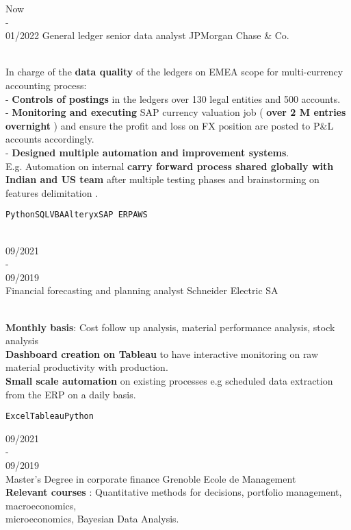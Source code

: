 \documentclass[10pt]{formatting/format} %
\begin{document}
\begin{entrylist}
	\entry
		{\color{text} Now\\ -\\ 01/2022}
		{\color{text} \large General ledger senior data analyst}
		{\color{text} \large JPMorgan Chase \& Co.}
		{\color{text} \\In charge of the \textbf{data quality} of the ledgers on EMEA scope for multi-currency accounting process: \\- \textbf{Controls of postings} in the ledgers over 130 legal entities and 500 accounts.\\ - \textbf{Monitoring and executing} SAP currency valuation  job ( \textbf{over 2 M entries overnight} ) and ensure the profit and loss on FX position are posted to P\&L accounts accordingly.\\ 
  - \textbf{Designed multiple automation and improvement systems}.\\ E.g. Automation on internal \textbf{carry forward process shared globally with Indian and US team} after multiple testing phases and brainstorming on features delimitation .
 
\small{\texttt{Python}\slashsep\texttt{SQL}\slashsep\texttt{VBA}\slashsep\texttt{Alteryx}\slashsep\texttt{SAP ERP}\slashsep\texttt{AWS}}}\\


	\entry
		{\color{text}09/2021\\  - \\ 09/2019\\}
		{\color{text} \large Financial forecasting and planning analyst}
		{\large Schneider Electric SA}
		{\color{text} \\  \textbf{Monthly basis}: Cost follow up analysis,  material performance analysis, stock analysis\\
  \textbf{Dashboard creation on Tableau} to have interactive monitoring on raw material productivity with production.\\ \textbf{Small scale automation} on existing processes e.g scheduled data extraction from the ERP on a daily basis. 
  
  \texttt{Excel}\slashsep\texttt{Tableau}\slashsep\texttt{Python}}
\end{entrylist}
\begin{entrylist}
    \entry
        {\color{text} 09/2021\\  - \\ 09/2019\\}
        {\color{text} \normalsize Master's Degree in corporate finance}
        {\color{text} \normalsize Grenoble Ecole de Management}
        {\color{text}\textbf{\\Relevant courses} : Quantitative methods for decisions, portfolio management, macroeconomics,\\ microeconomics, Bayesian Data Analysis.}
\end{entrylist}
\end{document}
